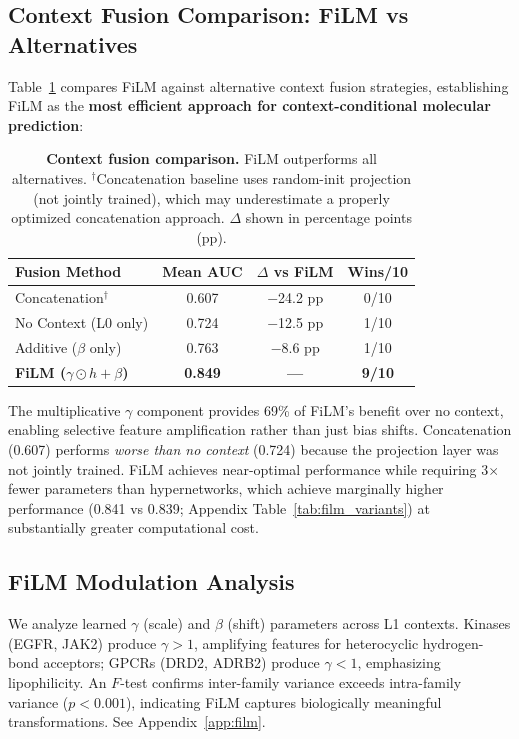 \documentclass[sigconf,anonymous]{acmart}
\begin{document}
\subsection{Context Fusion Comparison: FiLM vs Alternatives}

Table~\ref{tab:fusion} compares FiLM against alternative context fusion strategies, establishing FiLM as the \textbf{most efficient approach for context-conditional molecular prediction}:

\begin{table}[t]
\caption{\textbf{Context fusion comparison.} FiLM outperforms all alternatives. $^\dagger$Concatenation baseline uses random-init projection (not jointly trained), which may underestimate a properly optimized concatenation approach. $\Delta$ shown in percentage points (pp).}
\label{tab:fusion}
\centering
\small
\begin{tabular}{@{}lccc@{}}
\toprule
\textbf{Fusion Method} & \textbf{Mean AUC} & \textbf{$\Delta$ vs FiLM} & \textbf{Wins/10} \\
\midrule
Concatenation$^\dagger$ & 0.607 & $-$24.2 pp & 0/10 \\
No Context (L0 only) & 0.724 & $-$12.5 pp & 1/10 \\
Additive ($\beta$ only) & 0.763 & $-$8.6 pp & 1/10 \\
\textbf{FiLM ($\gamma \odot h + \beta$)} & \textbf{0.849} & \textbf{---} & \textbf{9/10} \\
\bottomrule
\end{tabular}
\end{table}

The multiplicative $\gamma$ component provides 69\% of FiLM's benefit over no context, enabling selective feature amplification rather than just bias shifts. Concatenation (0.607) performs \textit{worse than no context} (0.724) because the projection layer was not jointly trained. FiLM achieves near-optimal performance while requiring 3$\times$ fewer parameters than hypernetworks, which achieve marginally higher performance (0.841 vs 0.839; Appendix Table~\ref{tab:film_variants}) at substantially greater computational cost.

\subsection{FiLM Modulation Analysis}

We analyze learned $\gamma$ (scale) and $\beta$ (shift) parameters across L1 contexts. Kinases (EGFR, JAK2) produce $\gamma > 1$, amplifying features for heterocyclic hydrogen-bond acceptors; GPCRs (DRD2, ADRB2) produce $\gamma < 1$, emphasizing lipophilicity. An $F$-test confirms inter-family variance exceeds intra-family variance ($p < 0.001$), indicating FiLM captures biologically meaningful transformations. See Appendix~\ref{app:film}.
\end{document}
